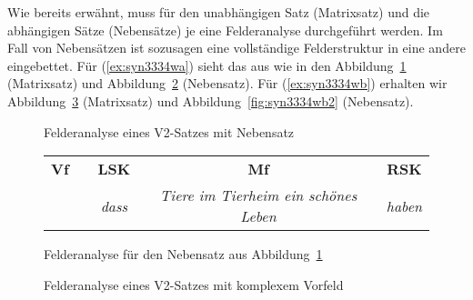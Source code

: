 \begin{exe}
  \ex\label{ex:saetze1426}
  \begin{xlist}
  \end{xlist}
\end{exe}

Wie bereits erwähnt, muss für den unabhängigen Satz (Matrixsatz) und die abhängigen Sätze (Nebensätze) je eine Felderanalyse durchgeführt werden.
Im Fall von Nebensätzen ist sozusagen eine vollständige Felderstruktur in eine andere eingebettet.
Für (\ref{ex:syn3334wa}) sieht das aus wie in den Abbildung~\ref{fig:syn3334wa1} (Matrixsatz) und Abbildung~\ref{fig:syn3334wa2} (Nebensatz).
Für (\ref{ex:syn3334wb}) erhalten wir Abbildung~\ref{fig:syn3334wb1} (Matrixsatz) und Abbildung~\ref{fig:syn3334wb2} (Nebensatz).


\begin{figure}[!htbp]
  \centering
  \caption{Felderanalyse eines V2-Satzes mit Nebensatz}
  \label{fig:syn3334wa1}
\end{figure}

\begin{figure}[!htbp]
  \centering
  \begin{tabular}{cp{0.1em}cp{0.1em}cp{0.1em}c}
    \textbf{Vf} && \textbf{LSK} && \textbf{Mf} && \textbf{RSK} \\
    \cmidrule{1-1}\cmidrule{3-3}\cmidrule{5-5}\cmidrule{7-7}
    && \textit{dass} && \textit{Tiere im Tierheim ein schönes Leben} && \textit{haben} \\
  \end{tabular}
  \caption{Felderanalyse für den Nebensatz aus Abbildung~\ref{fig:syn3334wa1}}
  \label{fig:syn3334wa2}
\end{figure}

\begin{figure}[!htbp]
  \centering
  \caption{Felderanalyse eines V2-Satzes mit komplexem Vorfeld}
  \label{fig:syn3334wb1}
\end{figure}

